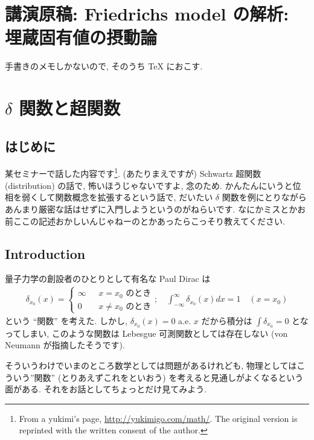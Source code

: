 \documentclass[openany, a4paper, oneside]{jsbook}
\theoremstyle{break}
\theoremstyle{breakdefn}
\begin{document}
\chapter{講演原稿: Friedrichs model の解析: 埋蔵固有値の摂動論}


手書きのメモしかないので, そのうち \TeX{} におこす.
\chapter{$\delta$ 関数と超関数}

\section{はじめに}


某セミナーで話した内容です\footnote{From a yukimi's page, \href{http://yukimigo.com/math/}{http://yukimigo.com/math/}.
The original version is reprinted with the written consent of the author.
 }.
(あたりまえですが) Schwartz 超関数 (distribution) の話で, 怖いほうじゃないですよ, 念のため.
かんたんにいうと位相を弱くして関数概念を拡張するという話で,
だいたい $\delta$ 関数を例にとりながらあんまり厳密な話はせずに入門しようというのがねらいです.
なにかミスとかお前ここの記述おかしいんじゃねーのとかあったらこっそり教えてください.
\section{Introduction}


量子力学の創設者のひとりとして有名な Paul Dirac は
\begin{align}
 \delta_{x_0}(x)
 =
 \begin{cases}
  \infty & \text{ $x = x_0$ のとき} \\
  0 & \text{ $x \neq x_0$ のとき}
 \end{cases}; \quad
 \int_{-\infty}^{\infty} \delta_{x_0} (x) dx
 =
 1 \quad (x = x_0)
\end{align}
という ``関数'' を考えた.
しかし, $\delta_{x_0}(x) = 0$ a.e. $x$ だから積分は $\int\delta_{x_0} = 0$ となってしまい,
このような関数は Lebesgue 可測関数としては存在しない (von Neumann が指摘したそうです).

そういうわけでいまのところ数学としては問題があるけれども,
物理としてはこういう''関数'' (とりあえずこれをといおう) を考えると見通しがよくなるという面がある.
それをお話としてちょっとだけ見てみよう.
\end{document}
